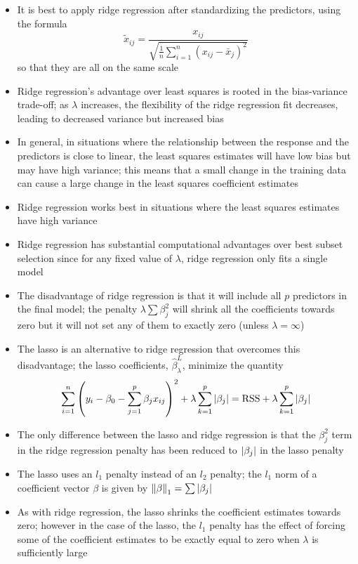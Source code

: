 \documentclass[12pt]{article}
\begin{document}
\begin{itemize}
\item It is best to apply ridge regression after standardizing the predictors, using the formula $$ \tilde{x}_{ij} = \frac{x_{ij}}{\sqrt{\frac{1}{n}\sum_{i=1}^n (x_{ij} - \bar{x}_j)^2}} $$ so that they are all on the same scale 
\item Ridge regression's advantage over least squares is rooted in the bias-variance trade-off; as $\lambda$ increases, the flexibility of the ridge regression fit decreases, leading to decreased variance but increased bias 
\item In general, in situations where the relationship between the response and the predictors is close to linear, the least squares estimates will have low bias but may have high variance; this means that a small change in the training data can cause a large change in the least squares coefficient estimates 
\item Ridge regression works best in situations where the least squares estimates have high variance 
\item Ridge regression has substantial computational advantages over best subset selection since for any fixed value of $\lambda$, ridge regression only fits a single model 
\item The disadvantage of ridge regression is that it will include all $p$ predictors in the final model; the penalty $\lambda \sum \beta_j^2$ will shrink all the coefficients towards zero but it will not set any of them to exactly zero (unless $\lambda = \infty$) 
\item The lasso is an alternative to ridge regression that overcomes this disadvantage; the lasso coefficients, $\hat{\beta}_\lambda^L$, minimize the quantity $$ \sum_{i=1}^n \left(y_i - \beta_0 - \sum_{j=1}^p \beta_jx_{ij}\right)^2 + \lambda\sum_{k=1}^p \abs{\beta_j} = \text{RSS} + \lambda \sum_{k=1}^p \abs{\beta_j} $$ 
\item The only difference between the lasso and ridge regression is that the $\beta_j^2$ term in the ridge regression penalty has been reduced to $\abs{\beta_j}$ in the lasso penalty 
\item The lasso uses an $l_1$ penalty instead of an $l_2$ penalty; the $l_1$ norm of a coefficient vector $\beta$ is given by $\norm{\beta}_1 = \sum \abs{\beta_j}$ 
\item As with ridge regression, the lasso shrinks the coefficient estimates towards zero; however in the case of the lasso, the $l_1$ penalty has the effect of forcing some of the coefficient estimates to be exactly equal to zero when $\lambda$ is sufficiently large 

\end{itemize}
\end{document}
